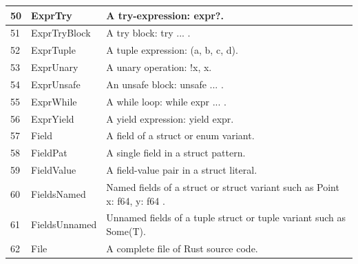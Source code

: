 \begin{longtable}{| p{} | p{} | p{} |}
50    & ExprTry                        & A try-expression: expr?.                                                                                       \\ \hline
51    & ExprTryBlock                   & A try block: try { ... }.                                                                                      \\ \hline
52    & ExprTuple                      & A tuple expression: (a, b, c, d).                                                                              \\ \hline
53    & ExprUnary                      & A unary operation: !x, \*x.                                                                                    \\ \hline
54    & ExprUnsafe                     & An unsafe block: unsafe { ... }.                                                                               \\ \hline
55    & ExprWhile                      & A while loop: while expr { ... }.                                                                              \\ \hline
56    & ExprYield                      & A yield expression: yield expr.                                                                                \\ \hline
57    & Field                          & A field of a struct or enum variant.                                                                           \\ \hline
58    & FieldPat                       & A single field in a struct pattern.                                                                            \\ \hline
59    & FieldValue                     & A field-value pair in a struct literal.                                                                        \\ \hline
60    & FieldsNamed                    & Named fields of a struct or struct variant such as Point { x: f64, y: f64 }.                                   \\ \hline
61    & FieldsUnnamed                  & Unnamed fields of a tuple struct or tuple variant such as Some(T).                                             \\ \hline
62    & File                           & A complete file of Rust source code.                                                                           \\ \hline

\end{longtable}
